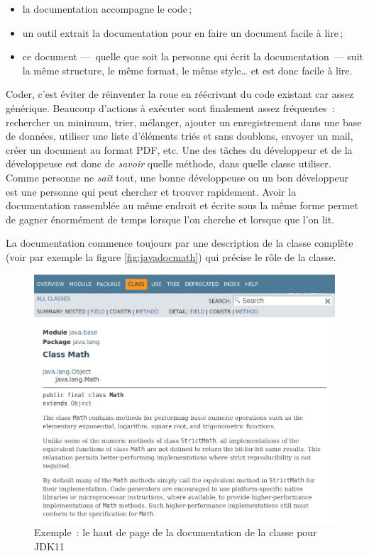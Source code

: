 \begin{itemize}
	\item la documentation accompagne le code\,;
	
	\item un outil extrait la documentation pour en faire un document facile
		à lire\,;

	\item ce document —~quelle que soit la personne qui écrit la
		documentation~— suit la même structure, le même format, le même style…
		et est donc facile à lire. 

\end{itemize}

Coder, c'est éviter de réinventer la roue en réécrivant du code existant car
assez générique. Beaucoup d'actions à exécuter sont finalement assez
fréquentes~: rechercher un minimum, trier, mélanger, ajouter un enregistrement
dans une base de données, utiliser une liste d'éléments triés et sans doublons,
envoyer un mail, créer un document au format PDF, etc. Une des tâches du développeur
et de la développeuse est donc de \textit{savoir} quelle méthode, dans quelle
classe utiliser. Comme personne ne \textit{sait} tout, une bonne développeuse
ou un bon développeur est une personne qui peut chercher et trouver rapidement.
Avoir la documentation rassemblée au même endroit et écrite sous la même forme
permet de gagner énormément de temps lorsque l'on cherche et lorsque que l'on
lit. 

La documentation commence toujours par une description de la classe complète
(voir par exemple la figure \vref{fig:javadocmath}) qui précise le
rôle de la classe. 

\begin{figure}[h]
	\centering
	\includegraphics[width=.9\linewidth]{images/javadoc-math.png}
	\caption{Exemple~: le haut de page de la documentation de la classe  pour JDK11}
	\label{fig:javadocmath}
\end{figure}

